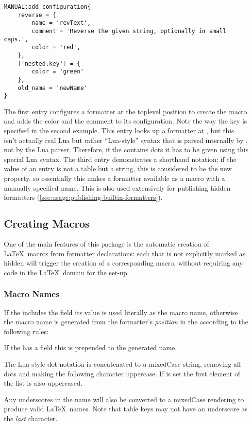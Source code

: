 \documentclass[12pt]{scrartcl}
\begin{document}
\begin{verbatim}
MANUAL:add_configuration{
	reverse = {
	    name = 'revText',
	    comment = 'Reverse the given string, optionally in small caps.',
	    color = 'red',
	},
	['nested.key'] = {
		color = 'green'
	},
	old_name = 'newName'
}
\end{verbatim}

\noindent The first entry configures a formatter at the toplevel position
 to create the macro  and adds the color and the
comment to its configuration.  Note the way the key is specified in the second
example.  This entry looks up a formatter at , but this isn't
actually real Lua but rather “Lua-style” syntax that is parsed internally by
\luatemplates, not by the Lua parser.  Therefore, if the  contains
dots it has to be given using this special Lua syntax.  The third entry
demonstrates a shorthand notation: if the value of an entry is not a table but a
string, this is considered to be the new  property, so essentially
this makes a formatter available as a macro with a manually specified name.
This is also used extensively for publishing hidden formatters
(\vref{sec:usage:publishing-builtin-formatters}).


\subsection{Creating Macros}
\label{sec:creating-macros}

One of the main features of this package is the automatic creation of \LaTeX\
macros from formatter declarations: each  that is not
explicitly marked as hidden will trigger the creation of a corresponding macro,
without requiring any code in the \LaTeX\ domain for the set-up.

\subsubsection{Macro Names}
\label{sec:usage:macro-names}

If the  includes the  field its value
is used literally as the macro name, otherwise the macro name is generated from
the formatter's \emph{position} in the \term{Templates Table} according to the
following rules:

\begin{itemize*}
\item If the  has a  field this is
prepended to the generated name.
\item The Lua-style dot-notation is concatenated to a mixedCase string,
removing all dots and making the following character uppercase.  If
\luavar{prefix} is set the first element of the list is also uppercased.
\item Any underscores in the name will also be converted to a mixedCase
rendering to produce valid \LaTeX\ names.  Note that table keys may not have an
underscore as the \emph{last} character.
\end{itemize*}
\end{document}
